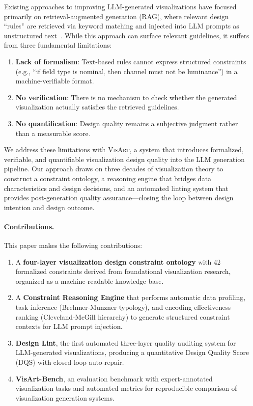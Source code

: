 \documentclass[journal]{vgtc}
\newcommand{\sysname}{\textsc{VisArt}}
\newcommand{\eg}{e.g.}
\begin{document}
Existing approaches to improving LLM-generated visualizations have focused primarily on retrieval-augmented generation (RAG), where relevant design ``rules'' are retrieved via keyword matching and injected into LLM prompts as unstructured text~\cite{li2024lightva}.
While this approach can surface relevant guidelines, it suffers from three fundamental limitations:
\begin{enumerate}
\item \textbf{Lack of formalism}: Text-based rules cannot express structured constraints (\eg{}, ``if field type is nominal, then channel must not be luminance'') in a machine-verifiable format.
\item \textbf{No verification}: There is no mechanism to check whether the generated visualization actually satisfies the retrieved guidelines.
\item \textbf{No quantification}: Design quality remains a subjective judgment rather than a measurable score.
\end{enumerate}

We address these limitations with \sysname{}, a system that introduces formalized, verifiable, and quantifiable visualization design quality into the LLM generation pipeline.
Our approach draws on three decades of visualization theory to construct a constraint ontology, a reasoning engine that bridges data characteristics and design decisions, and an automated linting system that provides post-generation quality assurance—closing the loop between design intention and design outcome.

\paragraph{Contributions.} This paper makes the following contributions:
\begin{enumerate}
\item A \textbf{four-layer visualization design constraint ontology} with 42 formalized constraints derived from foundational visualization research, organized as a machine-readable knowledge base.
\item A \textbf{Constraint Reasoning Engine} that performs automatic data profiling, task inference (Brehmer-Munzner typology), and encoding effectiveness ranking (Cleveland-McGill hierarchy) to generate structured constraint contexts for LLM prompt injection.
\item \textbf{Design Lint}, the first automated three-layer quality auditing system for LLM-generated visualizations, producing a quantitative Design Quality Score (DQS) with closed-loop auto-repair.
\item \textbf{VisArt-Bench}, an evaluation benchmark with expert-annotated visualization tasks and automated metrics for reproducible comparison of visualization generation systems.
\end{enumerate}
\end{document}
